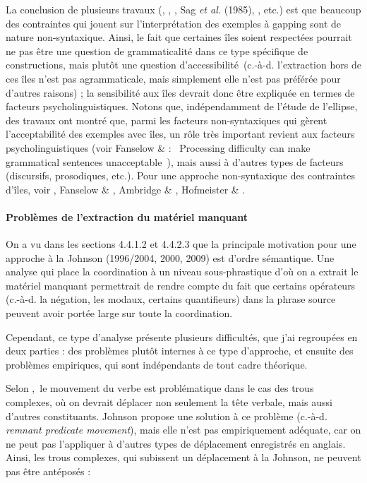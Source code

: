 La conclusion de plusieurs travaux (\citet{Hankamer1973}, \citet{Kuno1976}, \citet{Sag1976}, Sag \textit{et al.} (1985), \citet{Gardent1991}, etc.) est que beaucoup des contraintes qui jouent sur l'interprétation des exemples à gapping sont de nature non-syntaxique. Ainsi, le fait que certaines îles soient respectées pourrait ne pas être une question de grammaticalité dans ce type spécifique de constructions, mais plutôt une question d'accessibilité~(c.-à-d. l'extraction hors de ces îles n'est pas agrammaticale, mais simplement elle n'est pas préférée pour d'autres raisons) ; la sensibilité aux îles devrait donc être expliquée en termes de facteurs psycholinguistiques. Notons que, indépendamment de l'étude de l'ellipse, des travaux ont montré que, parmi les facteurs non-syntaxiques qui gèrent l'acceptabilité des exemples avec îles, un rôle très important revient aux facteurs psycholinguistiques (voir Fanselow \& \citet{Frisch2006} : {\guillemotleft}~Processing difficulty can make grammatical sentences unacceptable~{\guillemotright}), mais aussi à d'autres types de facteurs (discursifs, prosodiques, etc.). Pour une approche non-syntaxique des contraintes d'îles, voir \citet{Kluender1998}, Fanselow \& \citet{Frisch2006}, Ambridge \& \citet{Goldberg2008}, Hofmeister \& \citet{Sag2010}.  

\paragraph[Problèmes de l'extraction du matériel manquant]{Problèmes de l'extraction du matériel manquant}
On a vu dans les sections 4.4.1.2 et 4.4.2.3 que la principale motivation pour une approche à la Johnson (1996/2004, 2000, 2009) est d'ordre sémantique. Une analyse qui place la coordination à un niveau sous-phrastique d'où on a extrait le matériel manquant permettrait de rendre compte du fait que certains opérateurs (c.-à-d. la négation, les modaux, certains quantifieurs) dans la phrase source peuvent avoir portée large sur toute la coordination. 

Cependant, ce type d'analyse présente plusieurs difficultés, que j'ai regroupées en deux parties : des problèmes plutôt internes à ce type d'approche, et ensuite des problèmes empiriques, qui sont indépendants de tout cadre théorique. 

Selon \citet{Vicente2010},~le mouvement du verbe est problématique dans le cas des trous complexes, où on devrait déplacer non seulement la tête verbale, mais aussi d'autres constituants. Johnson propose une solution à ce problème (c.-à-d. \textit{remnant predicate movement}), mais elle n'est pas empiriquement adéquate, car on ne peut pas l'appliquer à d'autres types de déplacement enregistrés en anglais. Ainsi, les trous complexes, qui subissent un déplacement à la Johnson, ne peuvent pas être antéposés :


